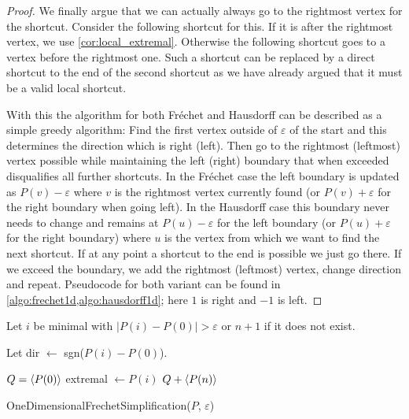 \begin{proof}
	We finally argue that we can actually always go to the rightmost vertex for the shortcut. Consider the following shortcut for this. If it is after the rightmost vertex, we use \cref{cor:local_extremal}. Otherwise the following shortcut goes to a vertex before the rightmost one. Such a shortcut can be replaced by a direct shortcut to the end of the second shortcut as we have already argued that it must be a valid local shortcut.

	With this the algorithm for both Fréchet and Hausdorff can be described as a simple greedy algorithm: Find the first vertex outside of \(\varepsilon\) of the start and this determines the direction which is right (left). Then go to the rightmost (leftmost) vertex possible while maintaining the left (right) boundary that when exceeded disqualifies all further shortcuts. In the Fréchet case the left boundary is updated as \(P(v) - \varepsilon\) where \(v\) is the rightmost vertex currently found (or \(P(v) + \varepsilon\) for the right boundary when going left). In the Hausdorff case this boundary never needs to change and remains at \(P(u) - \varepsilon\) for the left boundary (or \(P(u) + \varepsilon\) for the right boundary) where \(u\) is the vertex from which we want to find the next shortcut. If at any point a shortcut to the end is possible we just go there. If we exceed the boundary, we add the rightmost (leftmost) vertex, change direction and repeat. Pseudocode for both variant can be found in \cref{algo:frechet1d,algo:hausdorff1d}; here \(1\) is right and \(-1\) is left.
\end{proof}

\begin{algorithm}[htb]
  \DontPrintSemicolon
  \BlankLine
	Let \(i\) be minimal with \(|P(i)-P(0)| > \varepsilon\) or \(n+1\) if it does not exist. 

	Let dir \(\gets\) sgn(\(P(i)-P(0)\)).

	\(Q = \left\langle P(0)\right\rangle\)\;
	extremal \(\gets P(i)\)\;
	\Return \(Q + \left\langle P(n)\right\rangle\)
	\caption{OneDimensionalFrechetSimplification(\(P\), \(\varepsilon\))}
  \label{algo:frechet1d}
\end{algorithm}

